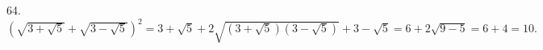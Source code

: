 64. $\left(\sqrt{3+\sqrt{5}}+\sqrt{3-\sqrt{5}}\right)^2=3+\sqrt{5}+2\sqrt{(3+\sqrt{5})(3-\sqrt{5})}+3-\sqrt{5}=
6+2\sqrt{9-5}=6+4=10.$\\
